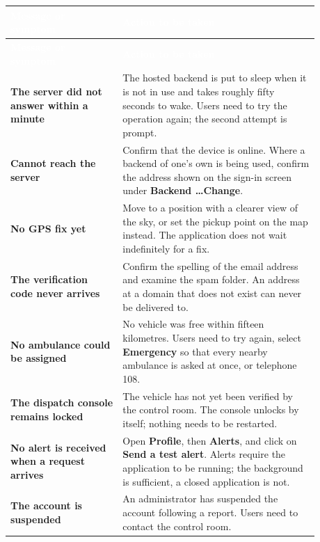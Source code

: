 \documentclass[11pt,a4paper]{article}
\newcommand{\thead}[1]{\textcolor{white}{\textbf{#1}}}
\begin{document}
\begin{center}
\small
\begin{longtable}{L{0.32\linewidth} L{0.56\linewidth}}
\thead{Message or symptom} & \thead{Action to be taken} \\
\endfirsthead
{}\thead{Message or symptom} & \thead{Action to be taken} \\
\endhead
\textbf{The server did not answer within a minute} &
The hosted backend is put to sleep when it is not in use and takes roughly
fifty seconds to wake. Users need to try the operation again; the second
attempt is prompt. \\
\textbf{Cannot reach the server} &
Confirm that the device is online. Where a backend of one's own is being used,
confirm the address shown on the sign-in screen under \textbf{Backend
\dots Change}. \\
\textbf{No GPS fix yet} &
Move to a position with a clearer view of the sky, or set the pickup point on
the map instead. The application does not wait indefinitely for a fix. \\
\textbf{The verification code never arrives} &
Confirm the spelling of the email address and examine the spam folder. An
address at a domain that does not exist can never be delivered to. \\
\textbf{No ambulance could be assigned} &
No vehicle was free within fifteen kilometres. Users need to try again, select
\textbf{Emergency} so that every nearby ambulance is asked at once, or
telephone 108. \\
\textbf{The dispatch console remains locked} &
The vehicle has not yet been verified by the control room. The console unlocks
by itself; nothing needs to be restarted. \\
\textbf{No alert is received when a request arrives} &
Open \textbf{Profile}, then \textbf{Alerts}, and click on \textbf{Send a test
alert}. Alerts require the application to be running; the background is
sufficient, a closed application is not. \\
\textbf{The account is suspended} &
An administrator has suspended the account following a report. Users need to
contact the control room. \\
\end{longtable}
\end{center}

\appendix
\end{document}
